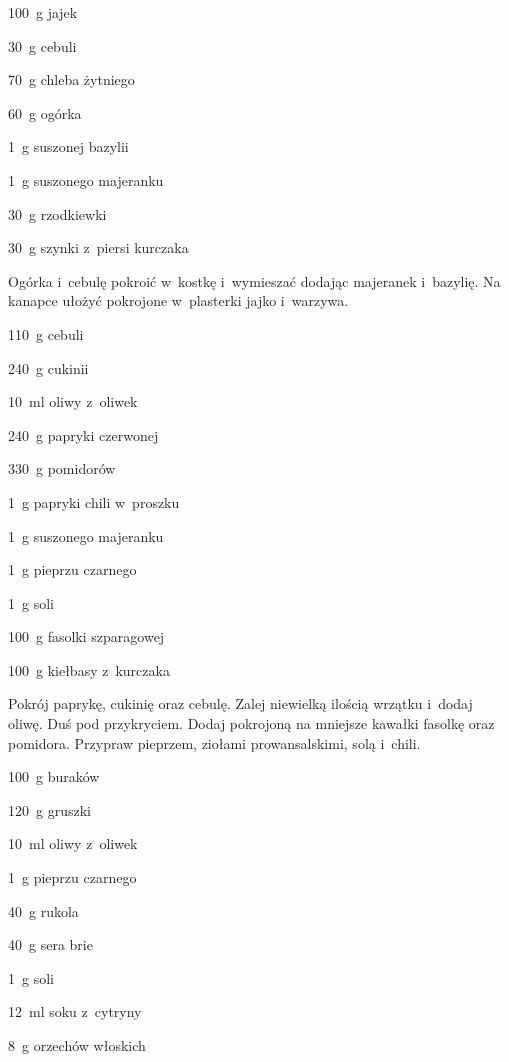 \documentclass[../main.tex]{subfiles}
\begin{document}

\begin{Ingred}
    \item \qty{100}{\gram} jajek
    \item \qty{30}{\gram} cebuli
    \item \qty{70}{\gram} chleba żytniego
    \item \qty{60}{\gram} ogórka
    \item \qty{1}{\gram} suszonej bazylii
    \item \qty{1}{\gram} suszonego majeranku
    \item \qty{30}{\gram} rzodkiewki
    \item \qty{30}{\gram} szynki z~piersi kurczaka
\end{Ingred}

Ogórka i~cebulę pokroić w~kostkę i~wymieszać dodając majeranek i~bazylię. Na
kanapce ułożyć pokrojone w~plasterki jajko i~warzywa.


\begin{Ingred}
    \item \qty{110}{\gram} cebuli
    \item \qty{240}{\gram} cukinii
    \item \qty{10}{\milli\litre} oliwy z~oliwek
    \item \qty{240}{\gram} papryki czerwonej
    \item \qty{330}{\gram} pomidorów
    \item \qty{1}{\gram} papryki chili w~proszku
    \item \qty{1}{\gram} suszonego majeranku
    \item \qty{1}{\gram} pieprzu czarnego
    \item \qty{1}{\gram} soli
    \item \qty{100}{\gram} fasolki szparagowej
    \item \qty{100}{\gram} kiełbasy z~kurczaka
\end{Ingred}

Pokrój paprykę, cukinię oraz cebulę. Zalej niewielką ilością wrzątku i~dodaj
oliwę. Duś pod przykryciem. Dodaj pokrojoną na mniejsze kawałki fasolkę oraz
pomidora. Przypraw pieprzem, ziołami prowansalskimi, solą i~chili.


\begin{Ingred}
    \item \qty{100}{\gram} buraków
    \item \qty{120}{\gram} gruszki
    \item \qty{10}{\milli\litre} oliwy z~oliwek
    \item \qty{1}{\gram} pieprzu czarnego
    \item \qty{40}{\gram} rukola
    \item \qty{40}{\gram} sera brie
    \item \qty{1}{\gram} soli
    \item \qty{12}{\milli\litre} soku z~cytryny
    \item \qty{8}{\gram} orzechów włoskich
\end{Ingred}
\end{document}
